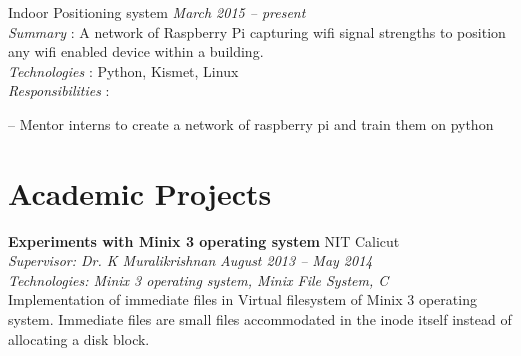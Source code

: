\documentclass[margin,line]{resume}
\begin{document}
\begin{resume}
    Indoor Positioning system				 \hfill \textit{March 2015 -- present} \\
\textit{Summary} : A network of Raspberry Pi capturing wifi signal strengths to position any wifi enabled device within a building. 	 \\
      \textit{Technologies} : Python, Kismet, Linux\\
      \textit{Responsibilities} : 
     	 	\begin{list2}
\item[--] Mentor interns to create a network of raspberry pi and train them on python
	\end{list2}
%	

	 


    \section{\mysidestyle Academic Projects}

   
	
	
    \textbf{Experiments with Minix 3 operating system } 				\hfill NIT Calicut \\
      \textit{Supervisor: Dr. K Muralikrishnan } 			\hfill \textit{August 2013 -- May 2014}\\
      \textit{Technologies: Minix 3 operating system, Minix File System, C }\\
    Implementation of immediate files in Virtual filesystem of Minix 3 operating system. Immediate files are small files accommodated in the inode itself instead of allocating a disk block. 


\end{resume}
\end{document}
